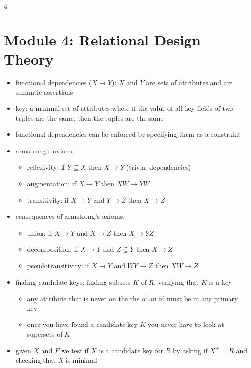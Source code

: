 \documentclass[8pt,landscape]{article}
\begin{document}
\begin{multicols*}{4}
      \section*{Module 4: Relational Design Theory}
		\begin{itemize}[leftmargin=*]
      \item functional dependencies (\(X\rightarrow Y\)): \(X\) and \(Y\) are sets of attributes and are semantic assertions
      \item key: a minimal set of attributes where if the value of all key fields of two tuples are the same, then the tuples are the same
      \item functional dependencies can be enforced by specifying them as a constraint
      \item armstrong's axioms
        \begin{itemize}
          \item reflexivity: if \(Y\subseteq X\) then \(X\rightarrow Y\) (trivial dependencies)
          \item augmentation: if \(X\rightarrow Y\) then \(XW\rightarrow YW\)
          \item transitivity: if \(X\rightarrow Y\) and \(Y\rightarrow Z\) then \(X\rightarrow Z\)
		\end{itemize}
  \item consequences of armstrong's axioms:
    \begin{itemize}
      \item union: if \(X\rightarrow Y\) and \(X\rightarrow Z\) then \(X\rightarrow YZ\)
      \item decomposition: if \(X\rightarrow Y\) and \(Z\subseteq Y\) then \(X\rightarrow Z\)
      \item pseudotransitivity: if \(X\rightarrow Y\) and \(WY\rightarrow Z\) then \(XW\rightarrow Z\)
		\end{itemize}
  \item finding candidate keys: finding subsets \(K\) of \(R\), verifying that \(K\) is a key
    \begin{itemize}
      \item any attribute that is never on the rhs of an fd must be in any primary key
      \item once you have found a candidate key \(K\) you never have to look at supersets of \(K\)
		\end{itemize}
  \item given \(X\) and \(F\) we test if \(X\) is a candidate key for \(R\) by asking if \(X^{+}=R\) and checking that \(X\) is minimal

\end{itemize}
\end{multicols*}
\end{document}
